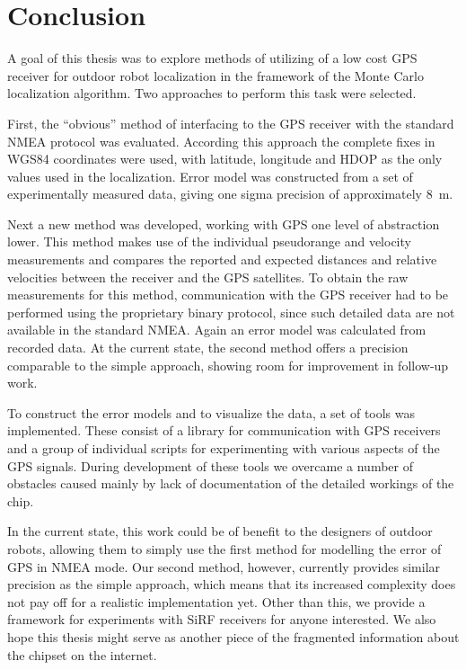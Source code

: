 \chapter{Conclusion}
\label{chap:conclusion}

A goal of this thesis was to explore methods of utilizing of a low cost GPS receiver
for outdoor robot localization in the framework of the Monte Carlo localization algorithm.
Two approaches to perform this task were selected.

First, the \enquote{obvious} method of interfacing to the GPS receiver with the
standard NMEA protocol was evaluated.
According this approach the complete fixes in WGS84 coordinates were used,
with latitude, longitude and HDOP as the only values used in the localization.
Error model was constructed from a set of experimentally measured data,
giving one sigma precision of approximately \SI{8}{\meter}.

Next a new method was developed, working with GPS one level of abstraction lower.
This method makes use of the individual pseudorange and velocity measurements
and compares the reported and expected distances and relative velocities between
the receiver and the GPS satellites.
To obtain the raw measurements for this method, communication with the GPS
receiver had to be performed using the proprietary binary protocol,
since such detailed data are not available in the standard NMEA.
Again an error model was calculated from recorded data.
At the current state, the second method offers a precision comparable to the simple
approach, showing room for improvement in follow-up work.

To construct the error models and to visualize the data, a set of tools was implemented.
These consist of a library for communication with \sirf GPS receivers
and a group of individual scripts for experimenting with various aspects of the GPS signals.
During development of these tools we overcame a number of obstacles caused mainly
by lack of documentation of the detailed workings of the \sirf chip.

In the current state, this work could be of benefit to the designers of
outdoor robots, allowing them to simply use the first method for modelling the
error of GPS in NMEA mode.
Our second method, however, currently provides similar precision as the simple
approach, which means that its increased complexity does not pay off for a realistic
implementation yet.
Other than this, we provide a framework for experiments with SiRF receivers
for anyone interested.
We also hope this thesis might serve as another piece of the fragmented
information about the \sirf chipset on the internet.
